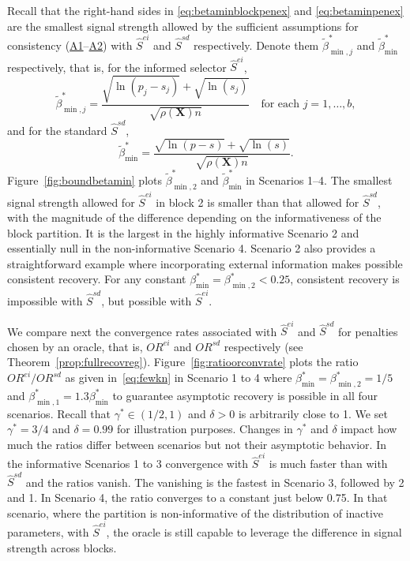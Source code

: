 \documentclass[
  12pt]{article}
\newcommand{\bX}{\mathbf{X}}
\begin{document}
Recall that the right-hand sides in \eqref{eq:betaminblockpenex} and \eqref{eq:betaminpenex} are the smallest signal strength allowed by the sufficient assumptions for consistency (\hyperlink{lab:A1}{A1}–\hyperlink{lab:A2}{A2}) with $\hat S^{ei}$ and $\hat S^{sd}$ respectively. Denote them $\tilde{\beta}^*_{\min,j}$ and $\tilde{\beta}^*_{\min}$ respectively, that is, for the informed selector $\hat S^{ei}$,
\begin{equation*}
\tilde{\beta}^*_{\min,j}
=
\frac{\sqrt{\ln(p_j-s_j)}+\sqrt{\ln(s_j)}}{\sqrt{\rho(\bX)n}}\quad\text{for each }j=1,\ldots,b,
\end{equation*}
and for the standard $\hat S^{sd}$,
\begin{equation*}
\tilde{\beta}^*_{\min}
=
\frac{\sqrt{\ln(p-s)}+\sqrt{\ln(s)}}{\sqrt{\rho(\bX)n}}.
\end{equation*}
Figure~\ref{fig:boundbetamin} plots $\tilde{\beta}^*_{\min,2}$ and $\tilde{\beta}^*_{\min}$ in Scenarios 1--4. The smallest signal strength allowed for $\hat S^{ei}$ in block 2 is smaller than that allowed for $\hat S^{sd}$, with the magnitude of the difference depending on the informativeness of the block partition. It is the largest in the highly informative Scenario 2 and essentially null in the non-informative Scenario 4. Scenario 2 also provides a straightforward example where incorporating external information makes possible consistent recovery. For any constant $\beta_{\min}^*=\beta_{\min,2}^*<0.25$, consistent recovery is impossible with $\hat S^{sd}$, but possible with $\hat S^{ei}$. 

We compare next the convergence rates associated with $\hat S^{ei}$ and $\hat S^{sd}$ for penalties chosen by an oracle, that is, ${OR}^{ei}$ and $OR^{sd}$ respectively (see Theorem~\ref{prop:fullrecovreg}). Figure~\ref{fig:ratioorconvrate} plots the ratio ${OR}^{ei}/OR^{sd}$ as given in~\eqref{eq:fewkn} in Scenario 1 to 4 where $\beta_{\min }^*=\beta_{\min,2}^*=1/5$ and  $\beta_{\min,1}^*=1.3\beta_{\min }^*$ to guarantee asymptotic recovery is possible in all four scenarios. Recall that $\gamma^*\in(1/2,1)$ and $\delta>0$ is arbitrarily close to 1. We set $\gamma^*=3/4$ and $\delta=0.99$ for illustration purposes. Changes in $\gamma^*$ and $\delta$ impact how much the ratios differ between scenarios but not their asymptotic behavior. In the informative Scenarios 1 to 3 convergence with $\hat S^{ei}$ is much faster than with $\hat S^{sd}$ and the ratios vanish. The vanishing is the fastest in Scenario 3, followed by 2 and 1. In Scenario 4, the ratio converges to a constant just below 0.75. In that scenario, where the partition is non-informative of the distribution of inactive parameters, with $\hat S^{ei}$, the oracle is still capable to leverage the difference in signal strength across blocks.
\end{document}
